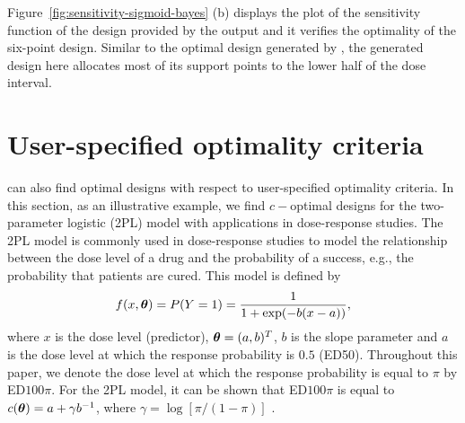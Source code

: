 Figure~\ref{fig:sensitivity-sigmoid-bayes} (b) displays the  plot of the  sensitivity function of  the design provided by the output  and it verifies the optimality of the six-point design.
Similar to the optimal design generated by , the generated design here allocates most of its support points to the lower half of the dose interval.


\section{User-specified optimality criteria}
\label{sec:new-optimality}
 can also find optimal designs with respect to  user-specified optimality criteria.   In this section, as an illustrative example, we  find $c-$optimal designs for  the two-parameter logistic (2PL) model with applications in dose-response studies.
The 2PL model is commonly used in dose-response studies   to  model the relationship between the dose level of a drug and the probability of  a success, e.g.,  the probability that patients are cured. This model is defined by
\begin{equation}
\label{eq:logistic-model}
f(x, \boldsymbol{\theta}) = P(Y=1) =  \frac{1}{1 + \exp(-b(x-a))},
\end{equation}
where  $x$ is the dose level (predictor), $\boldsymbol{\theta} = (a, b)^T$,  $b$ is the slope parameter  and $a$ is the dose level at which the response probability is $0.5$ (ED50).  Throughout this paper, we denote the   dose level at which the response probability is equal to $\pi$ by ED$100\pi$.
For the 2PL model, it can be shown that ED$100\pi$  is equal to  $c(\boldsymbol{\theta}) = a + \gamma b^{-1}$, where $\gamma = \log[\pi/(1-\pi)]$ \citep[see, e.g.,][]{zhu2001bayesian}. 

  
